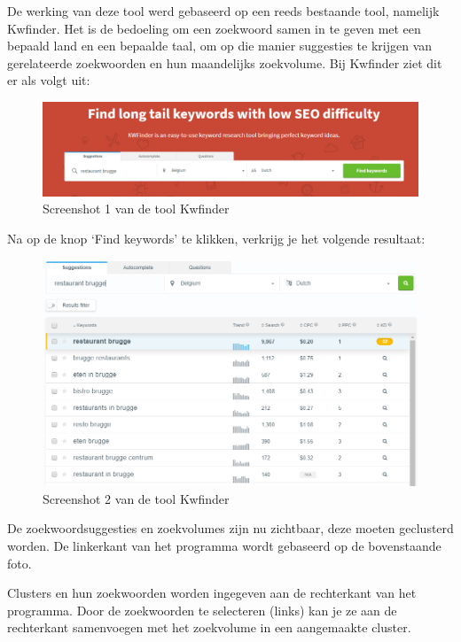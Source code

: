 De werking van deze tool werd gebaseerd op een reeds bestaande tool, namelijk Kwfinder. Het is de bedoeling om een zoekwoord samen in te geven met een bepaald land en een bepaalde taal, om op die manier suggesties te krijgen van gerelateerde zoekwoorden en hun maandelijks zoekvolume. Bij Kwfinder ziet dit er als volgt uit: 

\begin{figure}[h!]
\centering
\includegraphics[width=\linewidth]{img/kwfindervoorbeeld.png}
\caption{Screenshot 1 van de tool Kwfinder}
\end{figure}

Na op de knop ‘Find keywords’ te klikken, verkrijg je het volgende resultaat: 

\begin{figure}[h!]
\centering
\includegraphics[width=\linewidth]{img/kwfindervoorbeeld2.png}
\caption{Screenshot 2 van de tool Kwfinder}
\end{figure}

De zoekwoordsuggesties en zoekvolumes zijn nu zichtbaar, deze moeten geclusterd worden. De linkerkant van het programma wordt gebaseerd op de bovenstaande foto. 

Clusters en hun zoekwoorden worden ingegeven aan de rechterkant van het programma. Door de zoekwoorden te selecteren (links) kan je ze aan de rechterkant samenvoegen met het zoekvolume in een aangemaakte cluster. 

